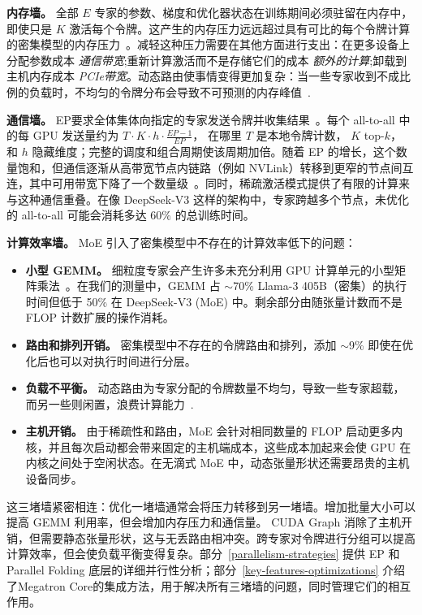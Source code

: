 \documentclass[10pt,logo,copyright]{nvidiatechreport_zh}
\begin{document}
\textbf{内存墙。} 全部 $E$ 专家的参数、梯度和优化器状态在训练期间必须驻留在内存中，即使只是 $K$ 激活每个令牌。这产生的内存压力远远超过具有可比的每个令牌计算的密集模型的内存压力~\cite{fedus2022switchtransformersscalingtrillion,Cai_2025}。减轻这种压力需要在其他方面进行支出：在更多设备上分配参数成本 \emph{通信带宽};重新计算激活而不是存储它们的成本 \emph{额外的计算};卸载到主机内存成本 \emph{PCIe带宽}。动态路由使事情变得更加复杂：当一些专家收到不成比例的负载时，不均匀的令牌分布会导致不可预测的内存峰值~\cite{lepikhin2020gshard,wang2024auxiliarylossfreeloadbalancingstrategy}.

\textbf{通信墙。} EP要求全体集体向指定的专家发送令牌并收集结果~\cite{lepikhin2020gshard}。每个 all-to-all 中的每 GPU 发送量约为 $T \cdot K \cdot h \cdot \frac{EP-1}{EP}$， 在哪里 $T$ 是本地令牌计数， $K$ top-$k$， 和 $h$ 隐藏维度；完整的调度和组合周期使该周期加倍。随着 EP 的增长，这个数量饱和，但通信逐渐从高带宽节点内链路（例如 NVLink）转移到更窄的节点间互连，其中可用带宽下降了一个数量级~\cite{deepep2025}。同时，稀疏激活模式提供了有限的计算来与这种通信重叠。在像 DeepSeek-V3 这样的架构中，专家跨越多个节点，未优化的 all-to-all 可能会消耗多达 60\% 的总训练时间。

\textbf{计算效率墙。} MoE 引入了密集模型中不存在的计算效率低下的问题：
\begin{itemize}[nosep,leftmargin=*]
    \item \textbf{小型 GEMM。} 细粒度专家会产生许多未充分利用 GPU 计算单元的小型矩阵乘法~\cite{megablocks}。在我们的测量中，GEMM 占 $\sim$70\% Llama-3 405B（密集）的执行时间但低于 50\% 在 DeepSeek-V3 (MoE) 中。剩余部分由随张量计数而不是 FLOP 计数扩展的操作消耗。
    \item \textbf{路由和排列开销。} 密集模型中不存在的令牌路由和排列，添加 $\sim$9\% 即使在优化后也可以对执行时间进行分层。
    \item \textbf{负载不平衡。} 动态路由为专家分配的令牌数量不均匀，导致一些专家超载，而另一些则闲置，浪费计算能力~\cite{wang2024auxiliarylossfreeloadbalancingstrategy}.
    \item \textbf{主机开销。} 由于稀疏性和路由，MoE 会针对相同数量的 FLOP 启动更多内核，并且每次启动都会带来固定的主机端成本，这些成本加起来会使 GPU 在内核之间处于空闲状态。在无滴式 MoE 中，动态张量形状还需要昂贵的主机设备同步。
\end{itemize}

这三堵墙紧密相连：优化一堵墙通常会将压力转移到另一堵墙。增加批量大小可以提高 GEMM 利用率，但会增加内存压力和通信量。 CUDA Graph 消除了主机开销，但需要静态张量形状，这与无丢路由相冲突。跨专家对令牌进行分组可以提高计算效率，但会使负载平衡变得复杂。部分~\ref{parallelism-strategies} 提供 EP 和 Parallel Folding 底层的详细并行性分析；部分~\ref{key-features-optimizations} 介绍了Megatron Core的集成方法，用于解决所有三堵墙的问题，同时管理它们的相互作用。
\end{document}
